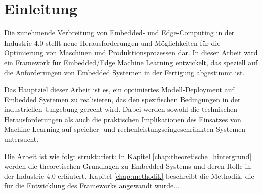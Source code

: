\chapter{Einleitung}
\label{chap:einleitung}

Die zunehmende Verbreitung von Embedded- und Edge-Computing in der Industrie 4.0 stellt neue Herausforderungen und Möglichkeiten für die Optimierung von Maschinen und Produktionsprozessen dar. In dieser Arbeit wird ein Framework für Embedded/Edge Machine Learning entwickelt, das speziell auf die Anforderungen von Embedded Systemen in der Fertigung abgestimmt ist.

Das Hauptziel dieser Arbeit ist es, ein optimiertes Modell-Deployment auf Embedded Systemen zu realisieren, das den spezifischen Bedingungen in der industriellen Umgebung gerecht wird. Dabei werden sowohl die technischen Herausforderungen als auch die praktischen Implikationen des Einsatzes von Machine Learning auf speicher- und rechenleistungseingeschränkten Systemen untersucht.

Die Arbeit ist wie folgt strukturiert: In Kapitel \ref{chap:theoretische_hintergrund} werden die theoretischen Grundlagen zu Embedded Systems und deren Rolle in der Industrie 4.0 erläutert. Kapitel \ref{chap:methodik} beschreibt die Methodik, die für die Entwicklung des Frameworks angewandt wurde...

\cite{smith2024}  %
\cite{miller2022}  %
\cite{johnson2023}  %

